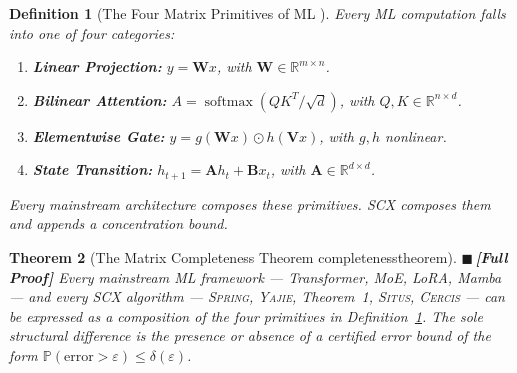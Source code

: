 \documentclass[12pt,a4paper]{article}
\newtheorem{theorem}{Theorem}[section]
\newtheorem{definition}[theorem]{Definition}
\theoremstyle{definition}
\newcommand{\rigorFull}{{\color{rigorcolor}$\blacksquare$\,\textbf{[Full Proof]}}}
\newcommand{\Situs}{\textsc{Situs}}
\newcommand{\Yajie}{\textsc{Yajie}}
\newcommand{\Spring}{\textsc{Spring}}
\newcommand{\Cercis}{\textsc{Cercis}}
\newcommand{\SCX}{\textsc{SCX}}
\DeclareMathOperator{\softmax}{softmax}
\newcommand{\R}{\mathbb{R}}
\newcommand{\Pbb}{\mathbb{P}}
\newcommand{\mat}[1]{\mathbf{#1}}
\begin{document}
\begin{definition}[The Four Matrix Primitives of ML ]
\label{def:four_primitives}
Every ML computation falls into one of four categories:
\begin{enumerate}[label=(\textbf{P\arabic*}), nosep]
    \item \textbf{Linear Projection:} $y = \mat{W}x$, with $\mat{W} \in \R^{m \times n}$.
    \item \textbf{Bilinear Attention:} $A = \softmax(QK^T/\sqrt{d})$, with $Q, K \in \R^{n \times d}$.
    \item \textbf{Elementwise Gate:} $y = g(\mat{W}x) \odot h(\mat{V}x)$, with $g, h$ nonlinear.
    \item \textbf{State Transition:} $h_{t+1} = \mat{A}h_t + \mat{B}x_t$, with $\mat{A} \in \R^{d \times d}$.
\end{enumerate}
Every mainstream architecture composes these primitives. \SCX{} composes them and 
appends a concentration bound.
\end{definition}

\begin{theorem}[The Matrix Completeness Theorem completenesstheorem]\label{thm:completeness}
\rigorFull
Every mainstream ML framework — Transformer, MoE, LoRA, Mamba — and every \SCX{} 
algorithm — \Spring{}, \Yajie{}, Theorem~1, \Situs{}, \Cercis{} — can be expressed 
as a composition of the four primitives in Definition~\ref{def:four_primitives}.
The sole structural difference is the presence or absence of a certified error bound 
of the form $\Pbb(\text{error} > \varepsilon) \leq \delta(\varepsilon)$.
\end{theorem}
\end{document}
